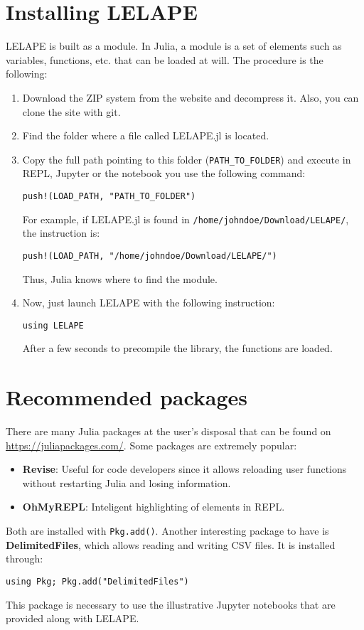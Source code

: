 \section{Installing LELAPE}
LELAPE is built as a module. In Julia, a module is a set of elements such as variables, functions, etc. that can be loaded at will. The procedure is the following:
%
\begin{enumerate}
	\item Download the ZIP system from the website and decompress it. Also, you can clone the site with git.
	\item Find the folder where a file called LELAPE.jl is located.
	\item Copy the full path pointing to this folder (\texttt{PATH\_TO\_FOLDER}) and execute in REPL, Jupyter or the notebook you use the following command:
	
	\texttt{push!(LOAD\_PATH, "PATH\_TO\_FOLDER")}
	
	For example, if LELAPE.jl is found in \texttt{/home/johndoe/Download/LELAPE/}, the instruction is:
	
		\texttt{push!(LOAD\_PATH, "/home/johndoe/Download/LELAPE/")}
	
	Thus, Julia knows where to find the module.
	\item Now, just launch LELAPE with the following instruction:
	
	\texttt{using LELAPE}
	
	After a few seconds to precompile the library, the functions are loaded.
\end{enumerate}
%
\section{Recommended packages}
%
There are many Julia packages at the user's disposal that can be found on \href{https://juliapackages.com/}{https://juliapackages.com/}. Some packages are extremely popular:
\begin{itemize}
	\item \textbf{Revise}: Useful for code developers since it allows reloading user functions without restarting Julia and losing information.
	\item \textbf{OhMyREPL}: Inteligent highlighting of elements in REPL.
\end{itemize}

Both are installed with \texttt{Pkg.add()}. Another interesting package to have is \textbf{DelimitedFiles}, which allows reading and writing CSV files. It is installed through:

\texttt{using Pkg; Pkg.add("DelimitedFiles")}

This package is necessary to use the illustrative Jupyter notebooks that are provided along with LELAPE.
